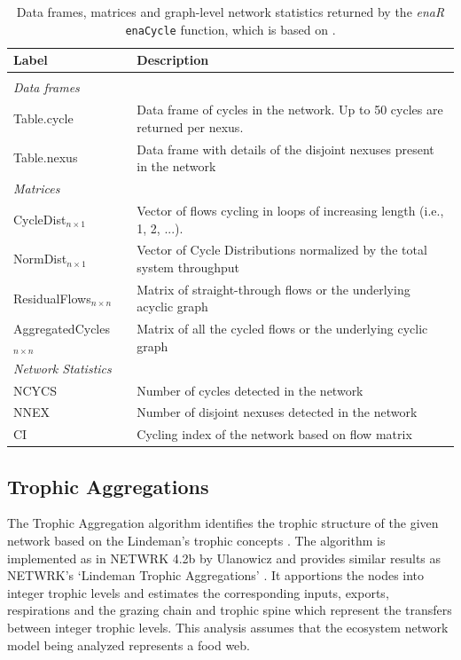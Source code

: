 \documentclass[article]{jss}
\begin{document}
 \begin{table}[t]
  \caption{Data frames, matrices and graph-level network statistics returned by the \textit{enaR}    %
    \texttt{enaCycle} function, which is based on \citep{ulanowicz83}.}\label{tab:cycle}
  \center
  \begin{small}
    \begin{tabularx}{\textwidth}{l p{10 cm}}
      \textbf{Label} & \textbf{Description} \\ \hline \\[-1.5ex]
      \multicolumn{2}{l}{\textit{Data frames}} \\[1ex]
      Table.cycle & Data frame of cycles in the network. Up to 50
      cycles are returned per nexus.  \\
      Table.nexus & Data frame with details of the disjoint nexuses present in the network\\[1ex]
      \multicolumn{2}{l}{\textit{Matrices}} \\[1ex]
      CycleDist$_{n \times 1}$ & Vector of flows cycling in loops of
      increasing length (i.e., 1, 2, ...). \\  %
      NormDist$_{n \times 1}$ & Vector of Cycle Distributions normalized by the total system throughput \\
      ResidualFlows$_{n \times n}$ & Matrix of straight-through flows or the underlying acyclic graph\\
      AggregatedCycles$_{n \times n}$ & Matrix of all the cycled flows or the underlying cyclic graph\\[1ex]
      \multicolumn{2}{l}{\textit{Network Statistics}} \\[1ex]
      NCYCS & Number of cycles detected in the network\\
      NNEX & Number of disjoint nexuses detected in the network\\
      CI & Cycling index of the network based on flow matrix\\ \hline
\end{tabularx}
\end{small}
\end{table}


\subsection{Trophic Aggregations}
The Trophic Aggregation algorithm identifies the trophic structure
of the given network based on the Lindeman's trophic concepts
\citep{lindeman42}. The algorithm is implemented as in NETWRK 4.2b
by Ulanowicz \citep{ulanowicz1979trophic} and provides similar
results as NETWRK's `Lindeman Trophic Aggregations' \citep{ulanowicz91}.
It apportions the nodes into integer trophic levels and estimates the
corresponding inputs, exports, respirations and the grazing chain and
trophic spine which represent the transfers between integer trophic
levels.  This analysis assumes that the ecosystem network model being
analyzed represents a food web.
\end{document}
